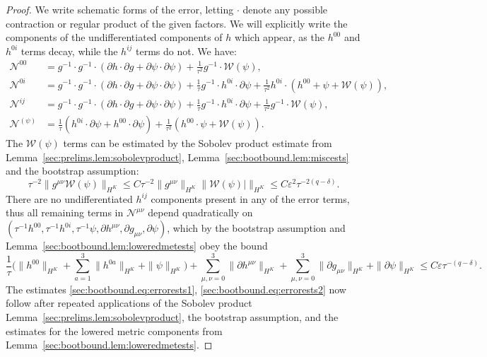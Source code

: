 \documentclass{article}
\newcommand{\mc}{\mathcal}
\newcommand{\ve}{\varepsilon}
\newcommand{\pa}{\partial}
\begin{document}
\begin{proof}
    We write schematic forms of the error, letting $\cdot$ denote any possible contraction or regular product of the given factors.  We will explicitly write the components of the undifferentiated components of $h$ which appear, as the $h^{00}$ and $h^{0i}$ terms decay, while the $h^{ij}$ terms do not. We have:
    \begin{subequations}
        \begin{align}
            \mc{N}^{00} &= g^{-1}\cdot g^{-1} \cdot (\pa  h \cdot \pa  g + \pa \psi \cdot \pa \psi) + \frac{1}{\tau^2}g^{-1} \cdot \mc{W}(\psi),\\
            \mc{N}^{0i} &= g^{-1}\cdot g^{-1} \cdot (\pa  h \cdot \pa  g + \pa \psi \cdot \pa \psi) +  \frac{1}{\tau}g^{-1}\cdot  h^{0i}\cdot \pa \psi +  \frac{1}{\tau^2}h^{0i} \cdot ( h^{00} + \psi  +\mc{W}(\psi)),\\
            \mc{N}^{ij}& = g^{-1}\cdot g^{-1}\cdot (\pa  h \cdot \pa  g + \pa \psi \cdot \pa \psi) +  \frac{1}{\tau}g^{-1}\cdot  h^{0i}\cdot \pa \psi +  \frac{1}{\tau^2}g^{-1}\cdot \mc{W}(\psi),\\
            \mc{N}^{(\psi)} &=   \frac{1}{\tau}(h^{0i} \cdot \pa \psi +  h^{00} \cdot \pa \psi)  +  \frac{1}{\tau^2}( h^{00}\cdot \psi + \mc{W}(\psi)).
        \end{align}
    \end{subequations}
    The $\mc{W}(\psi)$ terms can be estimated by the Sobolev product estimate from Lemma~\ref{sec:prelims.lem:sobolevproduct}, Lemma~\ref{sec:bootbound.lem:miscests} and the bootstrap assumption:
    \begin{equation}
        \tau^{-2}\|g^{\mu\nu}\mc{W}(\psi)\|_{H^K} \leq C\tau^{-2}\|g^{\mu\nu}\|_{H^K}\|\mc{W}(\psi)|\|_{H^K} \leq C\ve^2\tau^{-2(q-\delta)}.
    \end{equation}
    There are no undifferentiated $h^{ij}$ components present in any of the error terms, thus all remaining terms in $\mc{N}^{\mu\nu}$ depend quadratically on $(\tau^{-1}h^{00},\tau^{-1}h^{0i},\tau^{-1}\psi,\pa h^{\mu\nu},\pa g_{\mu\nu},\pa \psi)$, which by the bootstrap assumption and Lemma~\ref{sec:bootbound.lem:loweredmetests} obey the bound
    \begin{equation}
        \frac{1}{\tau}\Big(\|h^{00}\|_{H^K} + \sum_{a = 1}^3 \|h^{0a}\|_{H^K} + \|\psi\|_{H^K}\Big) + \sum_{\mu,\nu=0}^3\|\pa h^{\mu\nu}\|_{H^K} + \sum_{\mu,\nu=0}^3 \|\pa g_{\mu\nu}\|_{H^K} + \|\pa \psi\|_{H^K} \leq C \ve \tau^{-(q-\delta)}.
    \end{equation}
    The estimates \eqref{sec:bootbound.eq:errorests1}, \eqref{sec:bootbound.eq:errorests2} now follow after repeated applications of the Sobolev product Lemma~\ref{sec:prelims.lem:sobolevproduct}, the bootstrap assumption, and the estimates for the lowered metric components from Lemma~\ref{sec:bootbound.lem:loweredmetests}.
\end{proof}
\end{document}
